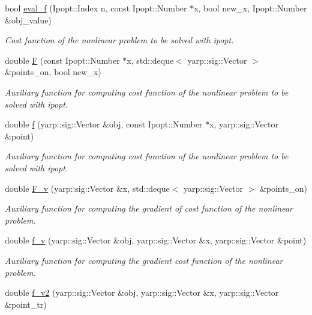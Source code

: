 \begin{DoxyCompactItemize}
bool \hyperlink{classgrasping__NLP_aaceeaa1991c241e731f12434f3acb44c}{eval\+\_\+f} (Ipopt\+::\+Index n, const Ipopt\+::\+Number $\ast$x, bool new\+\_\+x, Ipopt\+::\+Number \&obj\+\_\+value)
\begin{DoxyCompactList}\small\item\em Cost function of the nonlinear problem to be solved with ipopt. \end{DoxyCompactList}\item 
double \hyperlink{classgrasping__NLP_a1ed524c1fd216594e82a6b066c59ff9c}{F} (const Ipopt\+::\+Number $\ast$x, std\+::deque$<$ yarp\+::sig\+::\+Vector $>$ \&points\+\_\+on, bool new\+\_\+x)
\begin{DoxyCompactList}\small\item\em Auxiliary function for computing cost function of the nonlinear problem to be solved with ipopt. \end{DoxyCompactList}\item 
double \hyperlink{classgrasping__NLP_a88efaceff4a2274a91e13dcc95ad46d1}{f} (yarp\+::sig\+::\+Vector \&obj, const Ipopt\+::\+Number $\ast$x, yarp\+::sig\+::\+Vector \&point)
\begin{DoxyCompactList}\small\item\em Auxiliary function for computing cost function of the nonlinear problem to be solved with ipopt. \end{DoxyCompactList}\item 
double \hyperlink{classgrasping__NLP_aa9ba169c71508e72c011cc43e94b1fed}{F\+\_\+v} (yarp\+::sig\+::\+Vector \&x, std\+::deque$<$ yarp\+::sig\+::\+Vector $>$ \&points\+\_\+on)
\begin{DoxyCompactList}\small\item\em Auxiliary function for computing the gradient of cost function of the nonlinear problem. \end{DoxyCompactList}\item 
double \hyperlink{classgrasping__NLP_ab67b259991b21ef9c7d1a81a3cb31228}{f\+\_\+v} (yarp\+::sig\+::\+Vector \&obj, yarp\+::sig\+::\+Vector \&x, yarp\+::sig\+::\+Vector \&point)
\begin{DoxyCompactList}\small\item\em Auxiliary function for computing the gradient cost function of the nonlinear problem. \end{DoxyCompactList}\item 
double \hyperlink{classgrasping__NLP_a2cc9996f039f3049666a39bbf0e5a5f5}{f\+\_\+v2} (yarp\+::sig\+::\+Vector \&obj, yarp\+::sig\+::\+Vector \&x, yarp\+::sig\+::\+Vector \&point\+\_\+tr)

\end{DoxyCompactItemize}

